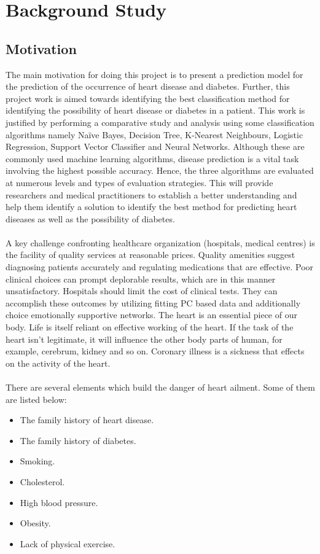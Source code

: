 \documentclass[oneside,12pt]{Classes/VTU}
\begin{document}
    \section{Background Study}
    \subsection{Motivation}

    The main motivation for doing this project is to present a prediction model for the prediction of the occurrence of heart disease and diabetes. Further, this project work is aimed towards identifying the best classification method for identifying the possibility of heart disease or diabetes in a patient. This work is justified by performing a comparative study and analysis using some classification algorithms namely Naïve Bayes, Decision Tree, K-Nearest Neighbours, Logistic Regression, Support Vector Classifier and Neural Networks. Although these are commonly used machine learning algorithms, disease prediction is a vital task involving the highest possible accuracy. Hence, the three algorithms are evaluated at numerous levels and types of evaluation strategies. This will provide researchers and medical practitioners to establish a better understanding and help them identify a solution to identify the best method for predicting heart diseases as well as the possibility of diabetes.
    \paragraph{}
    A key challenge confronting healthcare organization (hospitals, medical centres) is the facility of quality services at reasonable prices. Quality amenities suggest diagnosing patients accurately and regulating medications that are effective. Poor clinical choices can prompt deplorable results, which are in this manner unsatisfactory. Hospitals should limit the cost of clinical tests. They can accomplish these outcomes by utilizing fitting PC based data and additionally choice emotionally supportive networks. The heart is an essential piece of our body. Life is itself reliant on effective working of the heart. If the task of the heart isn't legitimate, it will influence the other body parts of human, for example, cerebrum, kidney and so on. Coronary illness is a sickness that effects on the activity of the heart.
    \paragraph{}
    There are several elements which build the danger of heart ailment. Some of them are listed below:
    \begin{itemize}
    	\item The family history of heart disease.
    	\item The family history of diabetes.
    	\item Smoking.
    	\item Cholesterol.
    	\item High blood pressure.
    	\item Obesity.
    	\item Lack of physical exercise.
    \end{itemize}
\end{document}
